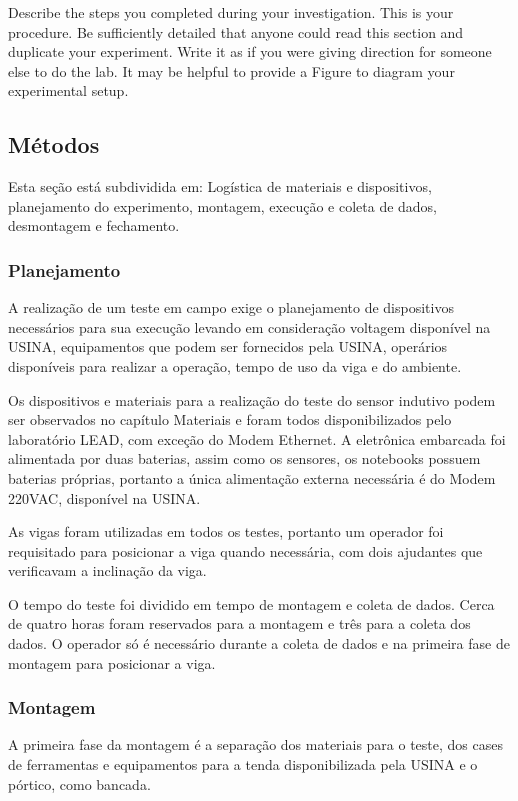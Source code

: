 
Describe the steps you completed during your investigation. This is your procedure. Be sufficiently detailed that anyone could read this section and duplicate your experiment. Write it as if you were giving direction for someone else to do the lab. It may be helpful to provide a Figure to diagram your experimental setup.


\subsection{Métodos}
Esta seção está subdividida em: Logística de materiais e dispositivos,
planejamento do experimento, montagem, execução e coleta de dados,
desmontagem e fechamento.
 
\subsubsection{Planejamento}
A realização de um teste em campo exige o planejamento de dispositivos
necessários para sua execução levando em consideração voltagem disponível na
USINA, equipamentos que podem ser fornecidos pela USINA, operários disponíveis
para realizar a operação, tempo de uso da viga e do ambiente.

Os dispositivos e materiais para a realização do teste do sensor indutivo podem
ser observados no capítulo Materiais e foram todos disponibilizados pelo
laboratório LEAD, com exceção do Modem Ethernet. A eletrônica embarcada foi
alimentada por duas baterias, assim como os sensores, os notebooks possuem
baterias próprias, portanto a única alimentação externa necessária é do Modem
220VAC, disponível na USINA.

As vigas foram utilizadas em todos os testes, portanto um operador foi
requisitado para posicionar a viga quando necessária, com dois ajudantes que
verificavam a inclinação da viga.

O tempo do teste foi dividido em tempo de montagem e coleta de dados. Cerca de
quatro horas foram reservados para a montagem e três para a coleta dos dados.
O operador só é necessário durante a coleta de dados e na primeira fase de
montagem para posicionar a viga.

\subsubsection{Montagem}
A primeira fase da montagem é a separação dos materiais para o teste, dos cases
de ferramentas e equipamentos para a tenda disponibilizada pela USINA e o
pórtico, como bancada.

